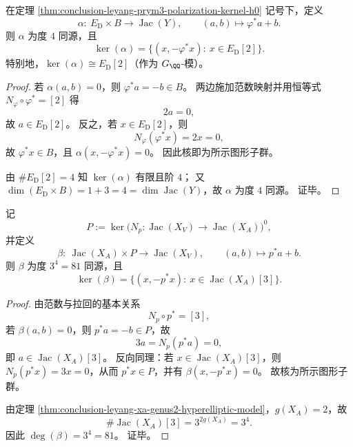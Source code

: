 \begin{proposition}\label{prop:conclusion-leyang-jacy-ed-b-degree4-graph-kernel}
在定理 \ref{thm:conclusion-leyang-prym3-polarization-kernel-h0} 记号下，定义
\[
\alpha:\ E_{\mathrm D}\times B\longrightarrow \operatorname{Jac}(Y),\qquad
(a,b)\longmapsto \varphi^*a+b.
\]
则 \(\alpha\) 为度 \(4\) 同源，且
\[
\ker(\alpha)=\{(x,-\varphi^*x):\ x\in E_{\mathrm D}[2]\}.
\]
特别地，\(\ker(\alpha)\cong E_{\mathrm D}[2]\)（作为 \(G_{\QQ}\)-模）。
\end{proposition}
\begin{proof}
若 \(\alpha(a,b)=0\)，则 \(\varphi^*a=-b\in B\)。
两边施加范数映射并用恒等式 \(N_{\varphi}\circ \varphi^*=[2]\) 得
\[
2a=0,
\]
故 \(a\in E_{\mathrm D}[2]\)。
反之，若 \(x\in E_{\mathrm D}[2]\)，则
\[
N_{\varphi}(\varphi^*x)=2x=0,
\]
故 \(\varphi^*x\in B\)，且 \(\alpha(x,-\varphi^*x)=0\)。
因此核即为所示图形子群。

由 \(\#E_{\mathrm D}[2]=4\) 知 \(\ker(\alpha)\) 有限且阶 \(4\)；
又 \(\dim(E_{\mathrm D}\times B)=1+3=4=\dim\operatorname{Jac}(Y)\)，故 \(\alpha\) 为度 \(4\) 同源。
证毕。
\end{proof}

\begin{proposition}\label{prop:conclusion-leyang-jacxv-jacxa-prym-degree81-graph-kernel}
记
\[
P:=\ker\!\bigl(N_p:\operatorname{Jac}(X_V)\to \operatorname{Jac}(X_A)\bigr)^0,
\]
并定义
\[
\beta:\ \operatorname{Jac}(X_A)\times P\longrightarrow \operatorname{Jac}(X_V),\qquad
(a,b)\longmapsto p^*a+b.
\]
则 \(\beta\) 为度 \(3^4=81\) 同源，且
\[
\ker(\beta)=\{(x,-p^*x):\ x\in \operatorname{Jac}(X_A)[3]\}.
\]
\end{proposition}
\begin{proof}
由范数与拉回的基本关系
\[
N_p\circ p^*=[3],
\]
若 \(\beta(a,b)=0\)，则 \(p^*a=-b\in P\)，故
\[
3a=N_p(p^*a)=0,
\]
即 \(a\in \operatorname{Jac}(X_A)[3]\)。
反向同理：若 \(x\in \operatorname{Jac}(X_A)[3]\)，则 \(N_p(p^*x)=3x=0\)，从而 \(p^*x\in P\)，并有 \(\beta(x,-p^*x)=0\)。
故核为所示图形子群。

由定理 \ref{thm:conclusion-leyang-xa-genus2-hyperelliptic-model}，\(g(X_A)=2\)，故
\[
\#\operatorname{Jac}(X_A)[3]=3^{2g(X_A)}=3^4.
\]
因此 \(\deg(\beta)=3^4=81\)。
证毕。
\end{proof}

